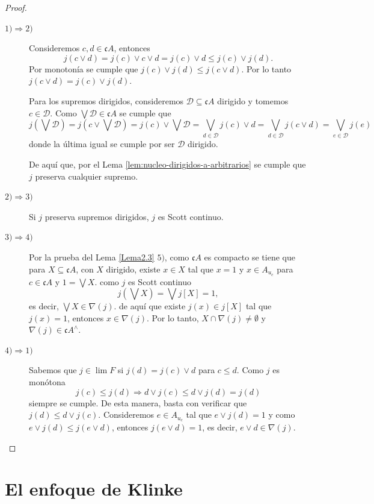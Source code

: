 \documentclass[11pt]{amsart}
\theoremstyle{plain}
\theoremstyle{definition}
\begin{document}
\begin{proof}
    \begin{description}
        \item[$1)\Rightarrow 2)$] Consideremos $c, d\in \mathfrak{c}A$, entonces
        \[
        j(c\vee d)=j(c)\vee c\vee d=j(c)\vee d\leq j(c)\vee j(d).
        \]
        Por monotonía se cumple que $j(c)\vee j(d)\leq j(c\vee d)$. Por lo tanto $j(c\vee d)=j(c)\vee j(d).$

        Para los supremos dirigidos, consideremos $\mathcal{D}\subseteq \mathfrak{c}A$ dirigido y tomemos $c\in \mathcal{D}$. Como $\bigvee \mathcal{D}\in \mathfrak{c}A$ se cumple que 
        \[
        j(\bigvee \mathcal{D})=j(c\vee \bigvee \mathcal{D})=j(c)\vee\bigvee \mathcal{D}=\bigvee_{d\in \mathcal{D}}j(c)\vee d=\bigvee_{d\in \mathcal{D}}j(c\vee d)=\bigvee_{e\in \mathcal{D}}j(e)
        \]
        donde la última igual se cumple por ser $\mathcal{D}$ dirigido. 

        De aquí que, por el Lema \ref{lem:nucleo-dirigidos-a-arbitrarios} se cumple que $j$ preserva cualquier supremo.

        \item[$2)\Rightarrow 3)$] Si $j$ preserva supremos dirigidos, $j$ es Scott continuo.

        \item[$3)\Rightarrow 4)$] Por la prueba del Lema \ref{Lema2.3} $5)$, como $\mathfrak{c}A$ es compacto se tiene que para $X\subseteq \mathfrak{c}A$, con $X$ dirigido, existe $x\in X$ tal que $x=1$ y $x\in A_{u_c}$ para $c\in \mathfrak{c}A$ y $1=\bigvee X$. como $j$ es Scott continuo
        \[
        j(\bigvee X)=\bigvee j[X]=1,
        \]
        es decir, $\bigvee X\in \nabla(j)$. de aquí que existe $j(x)\in j[X]$ tal que $j(x)=1$, entonces $x\in \nabla(j)$. Por lo tanto, $X\cap\nabla(j)\neq\emptyset$ y $\nabla(j)\in \mathfrak{c}A^\wedge$.

        \item[$4)\Rightarrow 1)$] Sabemos que $j\in \lim F$ si $j(d)=j(c)\vee d$ para $c\leq d$. Como $j$ es monótona
        \[
        j(c)\leq j(d)\Rightarrow d\vee j(c)\leq d\vee j(d)=j(d)
        \]
        siempre se cumple. De esta manera, basta con verificar que $j(d)\leq d\vee j(c)$. Consideremos $e\in A_{u_c}$ tal que $e\vee j(d)=1$ y como $e\vee j(d)\leq j(e\vee d)$, entonces $j(e\vee d)=1$, es decir, $e\vee d\in \nabla(j)$.
    \end{description}
\end{proof}

\section{El enfoque de Klinke}
\cite{klinke2013yet}
\end{document}
